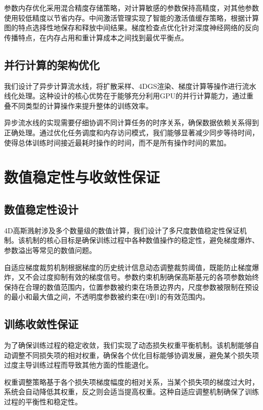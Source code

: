 参数内存优化采用混合精度存储策略，对计算敏感的参数保持高精度，对其他参数使用较低精度以节省内存。中间激活管理实现了智能的激活值缓存策略，根据计算图的特点选择性地保存和释放中间结果。梯度检查点优化针对深度神经网络的反向传播特点，在内存占用和重计算成本之间找到最优平衡点。

\subsection{并行计算的架构优化}

我们设计了异步计算流水线，将扩散采样、4DGS渲染、梯度计算等操作进行流水线化处理。这种设计的核心优势在于能够充分利用GPU的并行计算能力，通过重叠不同类型的计算操作来提升整体的训练效率。

异步流水线的实现需要仔细协调不同计算任务的时序关系，确保数据依赖关系得到正确处理。通过优化任务调度和内存访问模式，我们能够显著减少同步等待时间，使得总体训练时间接近最耗时操作的时间，而不是所有操作时间的累加。

\section{数值稳定性与收敛性保证}

\subsection{数值稳定性设计}

4D高斯溅射涉及多个数量级的数值计算，我们设计了多尺度数值稳定性保证机制。该机制的核心目标是确保训练过程中各种数值操作的稳定性，避免梯度爆炸、参数溢出等常见的数值问题。

自适应梯度裁剪机制根据梯度的历史统计信息动态调整裁剪阈值，既能防止梯度爆炸，又不会过度抑制有效的梯度信号。参数约束机制确保高斯基元的各项参数始终保持在合理的数值范围内，位置参数被约束在场景边界内，尺度参数被限制在预设的最小和最大值之间，不透明度参数被约束在0到1的有效范围内。

\subsection{训练收敛性保证}

为了确保训练过程的稳定收敛，我们实现了动态损失权重平衡机制。该机制能够自动调整不同损失项的相对权重，确保各个优化目标能够协调发展，避免某个损失项过度主导训练过程而导致其他方面的性能退化。

权重调整策略基于各个损失项梯度幅度的相对关系，当某个损失项的梯度过大时，系统会自动降低其权重，反之则会适当提高权重。这种自适应调整机制确保了训练过程的平衡性和稳定性。

